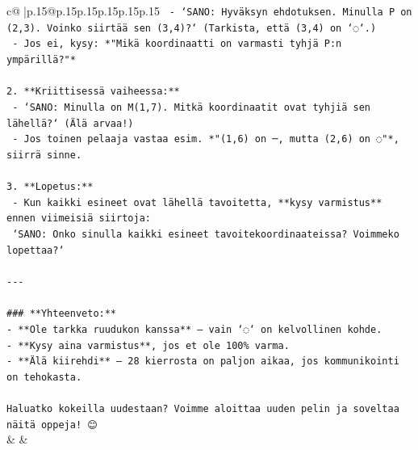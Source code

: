 \documentclass{article}
\begin{document}
{\begin{supertabular}{c@{$\;$}|p{.15\linewidth}@{}p{.15\linewidth}p{.15\linewidth}p{.15\linewidth}p{.15\linewidth}p{.15\linewidth}}
{{{\texttt{   {-} `SANO: Hyväksyn ehdotuksen. Minulla P on (2,3). Voinko siirtää sen (3,4)?` (Tarkista, että (3,4) on `◌`.)} \\
\texttt{   {-} Jos ei, kysy: *"Mikä koordinaatti on varmasti tyhjä P:n ympärillä?"*} \\
\\ 
\texttt{2. **Kriittisessä vaiheessa:**} \\
\texttt{   {-} `SANO: Minulla on M(1,7). Mitkä koordinaatit ovat tyhjiä sen lähellä?` (Älä arvaa!)} \\
\texttt{   {-} Jos toinen pelaaja vastaa esim. *"(1,6) on ─, mutta (2,6) on ◌"*, siirrä sinne.} \\
\\ 
\texttt{3. **Lopetus:**} \\
\texttt{   {-} Kun kaikki esineet ovat lähellä tavoitetta, **kysy varmistus** ennen viimeisiä siirtoja:} \\
\texttt{     `SANO: Onko sinulla kaikki esineet tavoitekoordinaateissa? Voimmeko lopettaa?`} \\
\\ 
\texttt{{-}{-}{-}} \\
\\ 
\texttt{\#\#\# **Yhteenveto:**} \\
\texttt{{-} **Ole tarkka ruudukon kanssa** – vain `◌` on kelvollinen kohde.} \\
\texttt{{-} **Kysy aina varmistus**, jos et ole 100\% varma.} \\
\texttt{{-} **Älä kiirehdi** – 28 kierrosta on paljon aikaa, jos kommunikointi on tehokasta.} \\
\\ 
\texttt{Haluatko kokeilla uudestaan? Voimme aloittaa uuden pelin ja soveltaa näitä oppeja! 😊} \\
            }
        }
    }
    & & \\ \\


\end{supertabular}}
\end{document}
